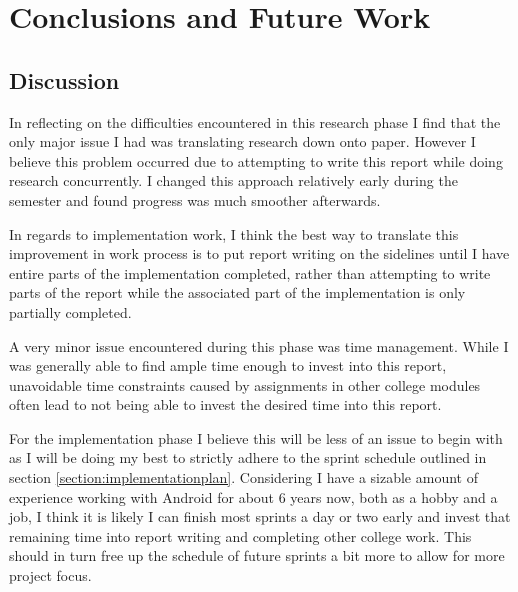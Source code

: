 \chapter{Conclusions and Future Work}
\label{chap:conclusions}

\section{Discussion}
\label{section:discussion}

In reflecting on the difficulties encountered in this research phase I find that the only major issue I had was translating research down onto paper. However I believe this problem occurred due to attempting to write this report while doing research concurrently. I changed this approach relatively early during the semester and found progress was much smoother afterwards. 

In regards to implementation work, I think the best way to translate this improvement in work process is to put report writing on the sidelines until I have entire parts of the implementation completed, rather than attempting to write parts of the report while the associated part of the implementation is only partially completed.

A very minor issue encountered during this phase was time management. While I was generally able to find ample time enough to invest into this report, unavoidable time constraints caused by assignments in other college modules often lead to not being able to invest the desired time into this report.

For the implementation phase I believe this will be less of an issue to begin with as I will be doing my best to strictly adhere to the sprint schedule outlined in section \ref{section:implementationplan}. Considering I have a sizable amount of experience working with Android for about 6 years now, both as a hobby and a job, I think it is likely I can finish most sprints a day or two early and invest that remaining time into report writing and completing other college work. This should in turn free up the schedule of future sprints a bit more to allow for more project focus.

